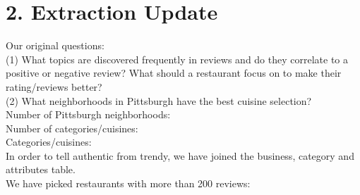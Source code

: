 \documentclass{neu_handout}
\begin{document}
\section*{2. Extraction Update}
Our original questions: \\
(1) What topics are discovered frequently in reviews and do they correlate to a positive or negative review? What should a restaurant focus on to make their rating/reviews better? \\
(2) What neighborhoods in Pittsburgh have the best cuisine selection? \\

Number of Pittsburgh neighborhoods: \\
Number of categories/cuisines: \\
Categories/cuisines: \\

In order to tell authentic from trendy, we have joined the business, category and attributes table.\\


We have picked restaurants with more than 200 reviews:
\end{document}
